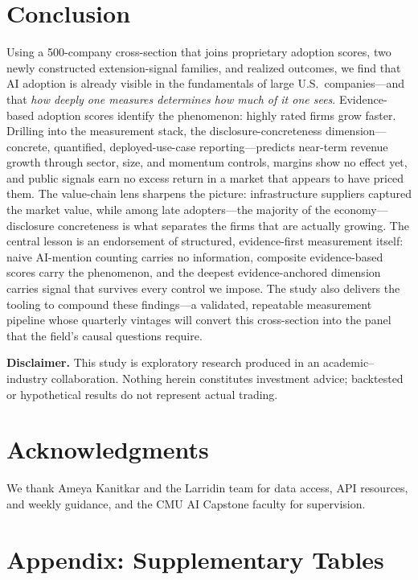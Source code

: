 \documentclass[11pt]{article}
\begin{document}
\section{Conclusion}

Using a 500-company cross-section that joins proprietary adoption scores, two
newly constructed extension-signal families, and realized outcomes, we find
that AI adoption is already visible in the fundamentals of large U.S.\
companies---and that \emph{how deeply one measures determines how much of it
one sees}. Evidence-based adoption scores identify the phenomenon: highly
rated firms grow faster. Drilling into the measurement stack, the
disclosure-concreteness dimension---concrete, quantified, deployed-use-case
reporting---predicts near-term revenue growth through sector, size, and
momentum controls, margins show no effect yet, and public signals earn no
excess return in a market that appears to have priced them. The value-chain
lens sharpens the picture: infrastructure suppliers captured the market value,
while among late adopters---the majority of the economy---disclosure
concreteness is what separates the firms that are actually growing. The
central lesson is an endorsement of structured, evidence-first measurement
itself: naive AI-mention counting carries no information, composite
evidence-based scores carry the phenomenon, and the deepest evidence-anchored
dimension carries signal that survives every control we impose. The study
also delivers the tooling to compound these findings---a validated,
repeatable measurement pipeline whose quarterly vintages will convert this
cross-section into the panel that the field's causal questions require.

\vspace{1em}
\noindent\textbf{Disclaimer.} This study is exploratory research produced in an
academic--industry collaboration. Nothing herein constitutes investment advice;
backtested or hypothetical results do not represent actual trading.

\section*{Acknowledgments}
We thank Ameya Kanitkar and the Larridin team for data access, API resources,
and weekly guidance, and the CMU AI Capstone faculty for supervision.

\appendix
\renewcommand{\thetable}{A\arabic{table}}
\setcounter{table}{0}

\section*{Appendix: Supplementary Tables}
\end{document}
